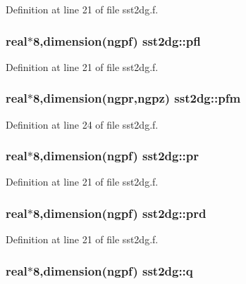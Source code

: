 Definition at line 21 of file sst2dg.f.\hypertarget{namespacesst2dg_2203dfee9c8d2e237448b1db690841e8}{
\subsubsection[pfl]{\setlength{\rightskip}{0pt plus 5cm}real$\ast$8,dimension(ngpf) {\bf sst2dg::pfl}}}
\label{namespacesst2dg_2203dfee9c8d2e237448b1db690841e8}




Definition at line 21 of file sst2dg.f.\hypertarget{namespacesst2dg_15842cce2147922d148223aebbdd979b}{
\subsubsection[pfm]{\setlength{\rightskip}{0pt plus 5cm}real$\ast$8,dimension(ngpr,ngpz) {\bf sst2dg::pfm}}}
\label{namespacesst2dg_15842cce2147922d148223aebbdd979b}




Definition at line 24 of file sst2dg.f.\hypertarget{namespacesst2dg_21c838c895717871a1ecda9aca97e18c}{
\subsubsection[pr]{\setlength{\rightskip}{0pt plus 5cm}real$\ast$8,dimension(ngpf) {\bf sst2dg::pr}}}
\label{namespacesst2dg_21c838c895717871a1ecda9aca97e18c}




Definition at line 21 of file sst2dg.f.\hypertarget{namespacesst2dg_4dcd19f888989c1c8a8b00ae96550144}{
\subsubsection[prd]{\setlength{\rightskip}{0pt plus 5cm}real$\ast$8,dimension(ngpf) {\bf sst2dg::prd}}}
\label{namespacesst2dg_4dcd19f888989c1c8a8b00ae96550144}




Definition at line 21 of file sst2dg.f.\hypertarget{namespacesst2dg_b6dac7ae161bf3684a33bfc278f4a627}{
\subsubsection[q]{\setlength{\rightskip}{0pt plus 5cm}real$\ast$8,dimension(ngpf) {\bf sst2dg::q}}}
\label{namespacesst2dg_b6dac7ae161bf3684a33bfc278f4a627}




